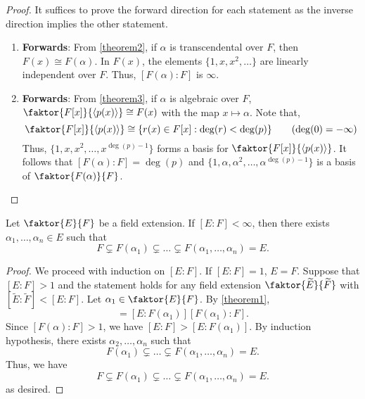 \documentclass[11pt]{article}
\newcommand{\cyclic}[1]{\left\langle #1 \right\rangle}
\newcommand{\quotient}[2]{\faktor{#1}{#2}}
\begin{document}
\begin{proof}
It suffices to prove the forward direction for each statement as the inverse
direction implies the other statement.
\begin{enumerate}
\item {\bf Forwards}: From \cref{theorem2}, if $\alpha$ is transcendental over
$F$, then $F(x) \cong F(\alpha)$. In $F(x)$, the elements $\{1, x, x^2, \dots\}$
are linearly independent over $F$. Thus, $[F(\alpha):F]$ is $\infty$.\\
\item {\bf Forwards}: From \cref{theorem3}, if $\alpha$ is algebraic over $F$,
$\quotient{F[x]}{\cyclic{p(x)}} \cong F(x)$ with the map $x \mapsto \alpha$.
Note that,
\begin{equation*}
\quotient{F[x]}{\cyclic{p(x)}} \cong \{r(x) \in F[x]: \deg(r) < \deg(p)\}
\tag{$\deg(0) = -\infty$}
\end{equation*}
Thus, $\{1, x, x^2, \dots, x^{\deg(p) - 1}\}$ forms a basis for
$\quotient{F[x]}{\cyclic{p(x)}}$. It follows that $[F(\alpha): F] =
\deg(p)$ and $\{1, \alpha, \alpha^2, \dots,
\alpha^{\deg (p) - 1}\}$ is a basis of $\quotient{F(\alpha)}{F}$.
\end{enumerate}
\end{proof}
\begin{theorem}
Let $\quotient{E}{F}$ be a field extension. If $[E:F] < \infty$, then there
exists $\alpha_1, \dots, \alpha_n \in E$ such that
\begin{equation*}
F \subsetneq F(\alpha_1) \subsetneq \dots \subsetneq F(\alpha_1, \dots,
\alpha_n) = E.
\end{equation*}
\end{theorem}
\begin{proof}
We proceed with induction on $[E:F]$. If $[E:F] = 1$, $E=F$. Suppose that $[E:F]
> 1$ and the statement holds for any field extension $\quotient{\tilde
E}{\tilde F}$ with $[\tilde E : \tilde F] < [E:F]$. Let $\alpha_1 \in
\quotient{E}{F}$. By \cref{theorem1},
\begin{equation*}
[E:F] = [E:F(\alpha_1)][F(\alpha_1) : F].
\end{equation*}
Since $[F(\alpha):F] > 1$, we have $[E:F] > [E:F(\alpha_1)]$. By induction
hypothesis, there exists $\alpha_2, \dots, \alpha_n$ such that
\begin{equation*}
F(\alpha_1) \subsetneq \dots \subsetneq F(\alpha_1, \dots, \alpha_n) = E.
\end{equation*}
Thus, we have
\begin{equation*}
F \subsetneq F(\alpha_1) \subsetneq \dots \subsetneq F(\alpha_1, \dots,
\alpha_n) = E.
\end{equation*}
as desired.
\end{proof}
\end{document}
